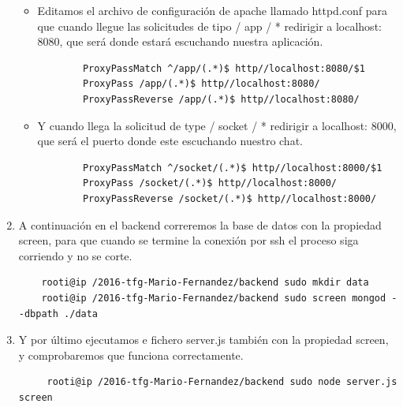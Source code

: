 \begin{enumerate}
\begin{itemize}
        \item  Editamos el archivo de configuración de apache llamado httpd.conf para que cuando llegue las solicitudes de tipo / app / * redirigir a localhost: 8080, que será donde estará escuchando nuestra aplicación.
        \begin{lstlisting}
        ProxyPassMatch ^/app/(.*)$ http//localhost:8080/$1
        ProxyPass /app/(.*)$ http//localhost:8080/
        ProxyPassReverse /app/(.*)$ http//localhost:8080/
        \end{lstlisting}
        \item Y cuando llega la solicitud de type / socket / * redirigir a localhost: 8000, que será el puerto donde este escuchando nuestro chat.
        \begin{lstlisting}
        ProxyPassMatch ^/socket/(.*)$ http//localhost:8000/$1
        ProxyPass /socket/(.*)$ http//localhost:8000/
        ProxyPassReverse /socket/(.*)$ http//localhost:8000/
        \end{lstlisting}
    \end{itemize}
   
    \item A continuación en el backend correremos la base de datos con la propiedad screen, para que cuando se termine la conexión por ssh el proceso siga corriendo y no se corte.
    \begin{lstlisting}
    rooti@ip /2016-tfg-Mario-Fernandez/backend sudo mkdir data
    rooti@ip /2016-tfg-Mario-Fernandez/backend sudo screen mongod --dbpath ./data
    \end{lstlisting} 
    \item Y por último ejecutamos e fichero server.js también con la propiedad screen, y comprobaremos que funciona correctamente.
    \begin{lstlisting}
     rooti@ip /2016-tfg-Mario-Fernandez/backend sudo node server.js screen
    \end{lstlisting} 
\end{enumerate}